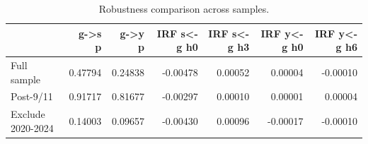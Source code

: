 \begin{table}[H]
\centering
\caption{Robustness comparison across samples.}
\label{tab:robustness}
\begin{tabular}{lrrrrrr}
\toprule
 & g->s p & g->y p & IRF s<-g h0 & IRF s<-g h3 & IRF y<-g h0 & IRF y<-g h6 \\
\midrule
Full sample & 0.47794 & 0.24838 & -0.00478 & 0.00052 & 0.00004 & -0.00010 \\
Post-9/11 & 0.91717 & 0.81677 & -0.00297 & 0.00010 & 0.00001 & 0.00004 \\
Exclude 2020-2024 & 0.14003 & 0.09657 & -0.00430 & 0.00096 & -0.00017 & -0.00010 \\
\bottomrule
\end{tabular}
\end{table}